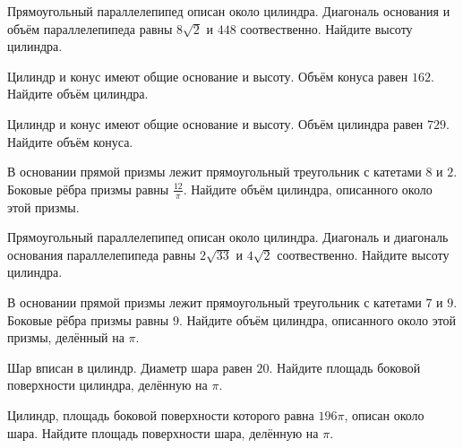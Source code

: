 \documentclass[4apaper]{article}
\begin{document}
\begin{taskBN}{34}
Прямоугольный параллелепипед описан около цилиндра. Диагональ основания и объём параллелепипеда равны $8\sqrt{2}$ и $448$ соотвественно. Найдите высоту цилиндра.
\end{taskBN}

\begin{taskBN}{35}
Цилиндр и конус имеют общие основание и высоту. Объём конуса равен $162$. Найдите объём цилиндра.
\end{taskBN}

\begin{taskBN}{36}
Цилиндр и конус имеют общие основание и высоту. Объём цилиндра равен $729$. Найдите объём конуса.
\end{taskBN}

\begin{taskBN}{37}
В основании прямой призмы лежит прямоугольный треугольник с катетами $8$ и $2$. Боковые рёбра призмы равны $\frac{12}{\pi}$. Найдите объём цилиндра, описанного около этой призмы.
\end{taskBN}

\begin{taskBN}{38}
Прямоугольный параллелепипед описан около цилиндра. Диагональ и диагональ основания параллелепипеда равны $2\sqrt{33}$ и $4\sqrt{2}$ соотвественно. Найдите высоту цилиндра.
\end{taskBN}

\begin{taskBN}{39}
В основании прямой призмы лежит прямоугольный треугольник с катетами $7$ и $9$. Боковые рёбра призмы равны $9$. Найдите объём цилиндра, описанного около этой призмы, делённый на $\pi$.
\end{taskBN}

\begin{taskBN}{40}
Шар вписан в цилиндр. Диаметр шара равен $20$. Найдите площадь боковой поверхности цилиндра, делённую на $\pi$.
\end{taskBN}

\begin{taskBN}{41}
 Цилиндр, площадь боковой поверхности которого равна $196\pi$, описан около шара. Найдите площадь поверхности шара, делённую на $\pi$.
\end{taskBN}
\end{document}
